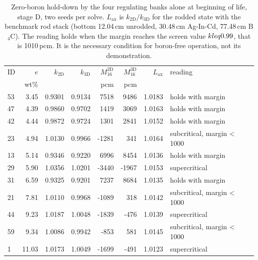 \begin{table}[htbp]
  \centering
  \footnotesize
  \caption{Zero-boron hold-down by the four regulating banks alone at beginning of life, stage D, two seeds per solve. $L_\mathrm{ax}$ is $k_\mathrm{2D}/k_\mathrm{3D}$ for the rodded state with the benchmark rod stack (bottom 12.04\,cm unrodded, 30.48\,cm Ag-In-Cd, 77.48\,cm B$_4$C). The reading holds when the margin reaches the screen value $k \\leq 0.99$, that is 1010\,pcm. It is the necessary condition for boron-free operation, not its demonstration.}
  \label{tab:c8-post-zeroboron}
  \begin{tabular}{@{}l r r r r r r l@{}}
    \toprule
    ID & $e$ & $k_\mathrm{2D}$ & $k_\mathrm{3D}$ & $M_{16}^\mathrm{2D}$ & $M_{16}^\mathrm{3D}$ & $L_\mathrm{ax}$ & reading \\
       & wt\% &  &  & pcm & pcm &  &  \\
    \midrule
    53 & 3.45 & 0.9301 & 0.9134 & 7518 & 9486 & 1.0183 & holds with margin \\
    47 & 4.39 & 0.9860 & 0.9702 & 1419 & 3069 & 1.0163 & holds with margin \\
    42 & 4.44 & 0.9872 & 0.9724 & 1301 & 2841 & 1.0152 & holds with margin \\
    23 & 4.94 & 1.0130 & 0.9966 & -1281 & 341 & 1.0164 & subcritical, margin < 1000 \\
    13 & 5.14 & 0.9346 & 0.9220 & 6996 & 8454 & 1.0136 & holds with margin \\
    29 & 5.90 & 1.0356 & 1.0201 & -3440 & -1967 & 1.0153 & supercritical \\
    31 & 6.59 & 0.9325 & 0.9201 & 7237 & 8684 & 1.0135 & holds with margin \\
    21 & 7.81 & 1.0110 & 0.9968 & -1089 & 318 & 1.0142 & subcritical, margin < 1000 \\
    44 & 9.23 & 1.0187 & 1.0048 & -1839 & -476 & 1.0139 & supercritical \\
    59 & 9.34 & 1.0086 & 0.9942 & -853 & 581 & 1.0145 & subcritical, margin < 1000 \\
    1 & 11.03 & 1.0173 & 1.0049 & -1699 & -491 & 1.0123 & supercritical \\
    \bottomrule
  \end{tabular}
\end{table}

